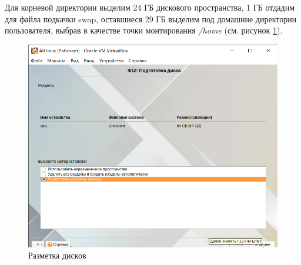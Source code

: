 \documentclass[a4paper,14pt]{extarticle}
\begin{document}
Для корневой директории выделим 24 ГБ дискового пространства, 1 ГБ отдадим для файла подкачки swap, оставшиеся 29 ГБ выделим под домашние директории пользователя, выбрав в качестве точки монтирования \textit{/home} (см. рисунок \ref{fig:mount}).
\begin{figure}[h!]
	\centering
	\includegraphics[width=0.7\linewidth]{"images/Практика МИРЭА/Alt linux [Работает] - Oracle VM VirtualBox 18.03.2022 14_52_28"}
	\caption{Разметка дисков}
	\label{fig:mount}
\end{figure}
\end{document}
